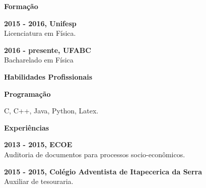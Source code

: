 \documentclass[a4paper,12pt,final]{memoir}
\newcommand{\Sep}{\vspace{1.5em}}
\newcommand{\SmallSep}{\vspace{0.5em}}
\newcommand{\CVSection}[1]
	{\Large\textbf{#1}\par
	\SmallSep\normalsize\normalfont}
\newcommand{\CVItem}[1]
	{\textbf{\color{RoyalBlue} #1}}
\begin{document}

\CVSection{Formação}

\CVItem{2015 - 2016, Unifesp} \\ 
Licenciatura em Física.
\SmallSep

\CVItem{2016 - presente, UFABC} \\ 
Bacharelado em Física
\Sep

  
\CVSection{Habilidades Profissionais}  
  
\CVItem{Programação}
\begin{compactitem}[\color{RoyalBlue}$\circ$]
\item C, C++, Java, Python, Latex.
\end{compactitem}
\Sep


\CVSection{Experiências}

\CVItem{2013 - 2015, ECOE} \\ 
Auditoria de documentos para processos socio-econômicos.
\SmallSep

\CVItem{2015 - 2015, Colégio Adventista de Itapecerica da Serra} \\ 
Auxiliar de tesouraria.
\Sep


\end{document}

